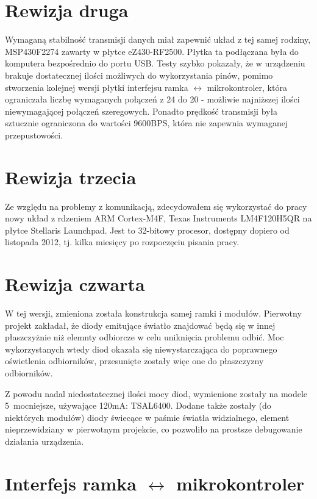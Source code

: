 \section{Rewizja druga}

Wymaganą stabilność transmisji danych miał zapewnić układ z tej samej rodziny, MSP430F2274 zawarty w płytce eZ430-RF2500. Płytka ta podłączana była do komputera bezpośrednio do portu USB. Testy szybko pokazały, że w urządzeniu brakuje dostatecznej ilości możliwych do wykorzystania pinów, pomimo stworzenia kolejnej wersji płytki interfejsu ramka $\leftrightarrow$ mikrokontroler, która ograniczała liczbę wymaganych połączeń z 24 do 20 - możliwie najniższej ilości niewymagającej połączeń szeregowych. Ponadto prędkość transmisji była sztucznie ograniczona do wartości 9600BPS, która nie zapewnia wymaganej przepustowości.\\

\section{Rewizja trzecia}

Ze względu na problemy z komunikacją, zdecydowałem się wykorzystać do pracy nowy układ z rdzeniem ARM Cortex-M4F, Texas Instruments LM4F120H5QR na płytce Stellaris Launchpad. Jest to 32-bitowy procesor, dostępny dopiero od listopada 2012, tj. kilka miesięcy po rozpoczęciu pisania pracy.\\

\section{Rewizja czwarta}

W tej wersji, zmieniona została konstrukcja samej ramki i modułów. Pierwotny projekt zakładał, że diody emitujące światło znajdować będą się w innej płaszczyżnie niż elemnty odbiorcze w celu uniknięcia problemu odbić. Moc wykorzystanych wtedy diod okazała się niewystarczająca do poprawnego oświetlenia odbiorników, przesunięte zostały więc one do płaszczyzny odbiorników.

Z powodu nadal niedostatecznej ilości mocy diod, wymienione zostały na modele 5\texttimes\  mocniejsze, używające 120mA: TSAL6400. Dodane także zostały (do niektórych modułów) diody świecące w paśmie światła widzialnego, element nieprzewidziany w pierwotnym projekcie, co pozwoliło na prostsze debugowanie działania urządzenia.\\

\section{Interfejs ramka $\leftrightarrow$ mikrokontroler}

